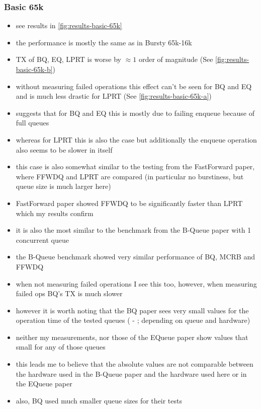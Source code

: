 \subsubsection{Basic 65k}
\begin{itemize}
    \item see results in \autoref{fig:results-basic-65k}
    \item the performance is mostly the same as in Bursty 65k-16k
    \item TX of BQ, EQ, LPRT is worse by $\approx 1$ order of magnitude (See \autoref{fig:results-basic-65k-b})
    \item without measuring failed operations this effect can't be seen for BQ and EQ and is much less
        drastic for LPRT (See \autoref{fig:results-basic-65k-a})
    \item suggests that for BQ and EQ this is mostly due to failing enqueue because of full queues
    \item whereas for LPRT this is also the case but additionally the enqueue operation also seems to be slower in itself
    \item this case is also somewhat similar to the testing from the FastForward paper, where FFWDQ and LPRT are compared (in particular no
        burstiness, but queue size is much larger here)
    \item FastForward paper showed FFWDQ to be significantly faster than LPRT which my results confirm
    \item it is also the most similar to the benchmark from the B-Queue paper with 1 concurrent queue
    \item the B-Queue benchmark showed very similar performance of BQ, MCRB and FFWDQ
    \item when not measuring failed operations I see this too, however, when measuring failed ops BQ's TX is much slower
    \item however it is worth noting that the BQ paper sees very small values for the operation time of the tested queues ( - ; depending on queue and hardware)
    \item neither my measurements, nor those of the EQueue paper show values that small for any of those queues
    \item this leads me to believe that the absolute values are not comparable between the hardware used in the B-Queue paper and the hardware used here or in the EQueue paper
    \item also, BQ used much smaller queue sizes for their tests
\end{itemize}
